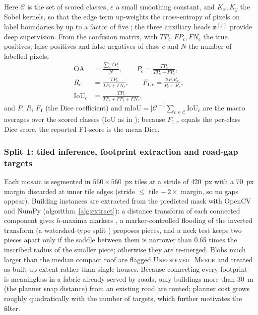 \documentclass[10pt,a4paper,twocolumn]{article}
\begin{document}
Here $\mathcal C$ is the set of scored classes, $\varepsilon$ a small smoothing constant, and $K_x,K_y$ the Sobel kernels, so that the edge term up-weights the cross-entropy of pixels on label boundaries by up to a factor of five \cite{milletari2016vnet}; the three auxiliary heads $\mathbf z^{(j)}$ provide deep supervision. From the confusion matrix, with $TP_c,FP_c,FN_c$ the true positives, false positives and false negatives of class $c$ and $N$ the number of labelled pixels,
\begin{equation}
\begin{aligned}
\mathrm{OA}&=\frac{\sum_c TP_c}{N},\qquad P_c=\frac{TP_c}{TP_c+FP_c},\\
R_c&=\frac{TP_c}{TP_c+FN_c},\qquad F_{1,c}=\frac{2P_cR_c}{P_c+R_c},\\
\mathrm{IoU}_c&=\frac{TP_c}{TP_c+FP_c+FN_c},
\end{aligned}
\label{eq:metrics}
\end{equation}
and $P$, $R$, $F_1$ (the Dice coefficient) and $\mathrm{mIoU}=|\mathcal C|^{-1}\sum_{c\in\mathcal C}\mathrm{IoU}_c$ are the macro averages over the scored classes (IoU as in \cite{everingham2010voc}); because $F_{1,c}$ equals the per-class Dice score, the reported F1-score is the mean Dice.

\subsubsection{Split 1: tiled inference, footprint extraction and road-gap targets}\label{sec:extract}
Each mosaic is segmented in $560\times560$~px tiles at a stride of 420~px with a 70~px margin discarded at inner tile edges (stride $\le$ tile $-\,2\times$ margin, so no gaps appear). Building instances are extracted from the predicted mask with OpenCV and NumPy \cite{bradski2000opencv,harris2020numpy} (algorithm~\ref{alg:extract}): a distance transform of each connected component \cite{felzenszwalb2012edt} gives $h$-maxima markers \cite{vincent1993morph}, a marker-controlled flooding of the inverted transform (a watershed-type split \cite{vincent1991watershed}) proposes pieces, and a neck test keeps two pieces apart only if the saddle between them is narrower than 0.65 times the inscribed radius of the smaller piece; otherwise they are re-merged. Blobs much larger than the median compact roof are flagged \textsc{Unresolved\_Merge} and treated as built-up extent rather than single houses. Because connecting every footprint is meaningless in a fabric already served by roads, only buildings more than 30~m (the planner snap distance) from an existing road are routed; planner cost grows roughly quadratically with the number of targets, which further motivates the filter.
\end{document}
